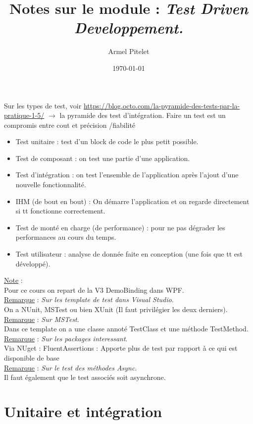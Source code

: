 \documentclass[a4paper,12pt,twoside]{article}
\title{Notes sur le module : \textit{Test Driven Developpement.}}
\author{Armel Pitelet}
\date{\today}
\newcommand{\incode}[1]{{\footnotesize\ttfamily #1}} %
\newcommand{\rem}[2]{\noindent\underline{Remarque} : \textit{#1}.\\ \indent #2}
\newcommand{\note}[1]{\noindent\underline{Note} : \\ \indent #1}
\begin{document}
\maketitle
\tableofcontents

Sur les types de test, voir \url{https://blog.octo.com/la-pyramide-des-tests-par-la-pratique-1-5/} $\to$ la pyramide des test d'intégration. Faire un test est un compromis entre cout et précision /fiabilité
\begin{itemize}
\item Test unitaire : test d'un block de code le plus petit possible.
\item Test de composant : on test une partie d'une application.
\item Test d'intégration : on test l'ensemble de l'application après l'ajout d'une nouvelle fonctionnalité.
\item IHM (de bout en bout) : On démarre l'application et on regarde directement si tt fonctionne correctement.
\item Test de monté en charge (de performance) : pour ne pas dégrader les performances au cours du temps.
\item Test utilisateur : analyse de donnée faite en conception (une fois que tt est développé).\\
\end{itemize}


\note{Pour ce cours on repart de la V3 DemoBinding dans WPF.}\\

\rem{Sur les template de test dans Visual Studio}{On a NUnit, MSTest ou bien XUnit (Il faut privilégier les deux derniers).}\\

\rem{Sur MSTest}{Dans ce template on a une classe annoté \incode{TestClass} et une méthode \incode{TestMethod}.}\\

\rem{Sur les packages interessant}{Via NUget : FluentAssertions : Apporte plus de test par rapport à ce qui est disponible de base}\\

\rem{Sur le test des méthodes Async}{Il faut également que le test associés soit asynchrone.}\\

\section{Unitaire et intégration}
\end{document}
